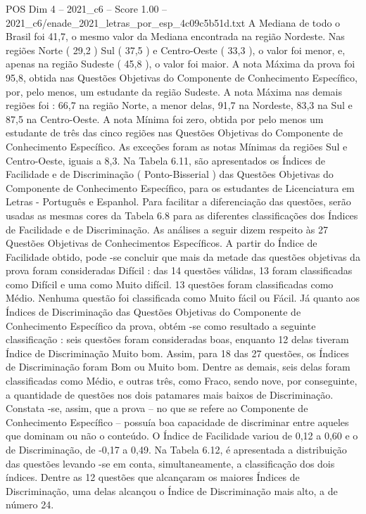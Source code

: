 \begin{textsample}{POS Dim 4 – 2021\_c6 – Score 1.00 – 2021\_c6/enade\_2021\_letras\_por\_esp\_4c09c5b51d.txt}
A Mediana de todo o Brasil foi 41,7, o mesmo valor da Mediana encontrada na região Nordeste.
Nas regiões Norte ( 29,2 ) Sul ( 37,5 ) e Centro-Oeste ( 33,3 ), o valor foi menor, e, apenas na região Sudeste ( 45,8 ), o valor foi maior.
A nota Máxima da prova foi 95,8, obtida nas Questões Objetivas do Componente de Conhecimento Específico, por, pelo menos, um estudante da região Sudeste.
A nota Máxima nas demais regiões foi : 66,7 na região Norte, a menor delas, 91,7 na Nordeste, 83,3 na Sul e 87,5 na Centro-Oeste.
A nota Mínima foi zero, obtida por pelo menos um estudante de três das cinco regiões nas Questões Objetivas do Componente de Conhecimento Específico.
As exceções foram as notas Mínimas da regiões Sul e Centro-Oeste, iguais a 8,3.
Na Tabela 6.11, são apresentados os Índices de Facilidade e de Discriminação ( Ponto-Bisserial ) das Questões Objetivas do Componente de Conhecimento Específico, para os estudantes de Licenciatura em Letras - Português e Espanhol.
Para facilitar a diferenciação das questões, serão usadas as mesmas cores da Tabela 6.8 para as diferentes classificações dos Índices de Facilidade e de Discriminação.
As análises a seguir dizem respeito às 27 Questões Objetivas de Conhecimentos Específicos.
A partir do Índice de Facilidade obtido, pode -se concluir que mais da metade das questões objetivas da prova foram consideradas Difícil : das 14 questões válidas, 13 foram classificadas como Difícil e uma como Muito difícil. 13 questões foram classificadas como Médio.
Nenhuma questão foi classificada como Muito fácil ou Fácil.
Já quanto aos Índices de Discriminação das Questões Objetivas do Componente de Conhecimento Específico da prova, obtém -se como resultado a seguinte classificação : seis questões foram consideradas boas, enquanto 12 delas tiveram Índice de Discriminação Muito bom.
Assim, para 18 das 27 questões, os Índices de Discriminação foram Bom ou Muito bom.
Dentre as demais, seis delas foram classificadas como Médio, e outras três, como Fraco, sendo nove, por conseguinte, a quantidade de questões nos dois patamares mais baixos de Discriminação.
Constata -se, assim, que a prova – no que se refere ao Componente de Conhecimento Específico – possuía boa capacidade de discriminar entre aqueles que dominam ou não o conteúdo.
O Índice de Facilidade variou de 0,12 a 0,60 e o de Discriminação, de -0,17 a 0,49.
Na Tabela 6.12, é apresentada a distribuição das questões levando -se em conta, simultaneamente, a classificação dos dois índices.
Dentre as 12 questões que alcançaram os maiores Índices de Discriminação, uma delas alcançou o Índice de Discriminação mais alto, a de número 24.

\end{textsample}
